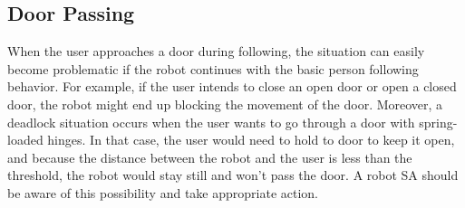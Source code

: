 %
%
%
%

\subsection{Door Passing}
\label{sec:following_door_passing}

When the user approaches a door during following, the situation can easily become problematic if the robot continues with the basic person following behavior. For example, if the user intends to close an open door or open a closed door, the robot might end up blocking the movement of the door. Moreover, a deadlock situation occurs when the user wants to go through a door with spring-loaded hinges. In that case, the user would need to hold to door to keep it open, and because the distance between the robot and the user is less than the threshold, the robot would stay still and won't pass the door. A robot SA should be aware of this possibility and take appropriate action. 


